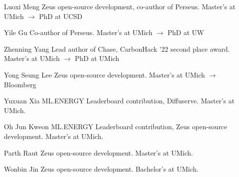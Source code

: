 

\begin{cvlist}

  \cvlistitem
    {Luoxi Meng}
    {Zeus open-source development, co-author of Perseus. Master's at UMich $\rightarrow$ PhD at UCSD}

  \cvlistitem
    {Yile Gu}
    {Co-author of Perseus. Master's at UMich $\rightarrow$ PhD at UW}

  \cvlistitem
    {Zhenning Yang}
    {Lead author of Chase, CarbonHack '22 second place award. Master's at UMich $\rightarrow$ PhD at UMich}

  \cvlistitem
    {Yong Seung Lee}
    {Zeus open-source development. Master's at UMich $\rightarrow$ Bloomberg}

  \cvlistitem
    {Yuxuan Xia}
    {ML.ENERGY Leaderboard contribution, Diffuserve. Master's at UMich.}

  \cvlistitem
    {Oh Jun Kweon}
    {ML.ENERGY Leaderboard contribution, Zeus open-source development. Master's at UMich.}

  \cvlistitem
    {Parth Raut}
    {Zeus open-source development. Master's at UMich.}

  \cvlistitem
    {Wonbin Jin}
    {Zeus open-source development. Bachelor's at UMich.}

\end{cvlist}
